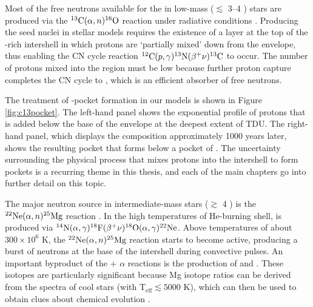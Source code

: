 Most of the free neutrons available for the \sprocess in low-mass ($\lesssim$ 3--4 \Msun) stars are produced via the $\mbox{${}^{13}{\text{C}}$}(\alpha,n)\mbox{${}^{16}{\text{O}}$}$ reaction under radiative conditions \citep{Cameron:1957eo,Scalo:1978ke,Straniero:1995ed,Gallino:1998eg}. Producing the seed  nuclei in stellar models requires the existence of a layer at the top of the -rich intershell in which protons are `partially mixed' down from the envelope, thus enabling the CN cycle reaction $\mbox{${}^{12}{\text{C}}$}(p,\gamma)\mbox{${}^{13}{\text{N}}$}(\beta^+\nu)\mbox{${}^{13}{\text{C}}$}$ to occur. The number of protons mixed into the region must be low because further proton capture completes the CN cycle to , which is an efficient absorber of free neutrons.

The treatment of -pocket formation in our models is shown in Figure \ref{fig:c13pocket}. The left-hand panel shows the exponential profile of protons that is added below the base of the envelope at the deepest extent of TDU. The right-hand panel, which displays the composition approximately 1000 years later, shows the resulting  pocket that forms below a pocket of . The uncertainty surrounding the physical process that mixes protons into the intershell to form  pockets is a recurring theme in this thesis, and each of the main chapters go into further detail on this topic.

The major neutron source in intermediate-mass stars ($\gtrsim$ 4 \Msun) is the $\mbox{${}^{22}{\text{Ne}}$}(\alpha,n)\allowbreak\mbox{${}^{25}{\text{Mg}}$}$ reaction \citep{Iben:1975bn,Scalo:1978ke}. In the high temperatures of He-burning shell,  is produced via $\mbox{${}^{14}{\text{N}}$}(\alpha,\gamma)\mbox{${}^{18}{\text{F}}$}(\beta^+\nu)\mbox{${}^{18}{\text{O}}$}(\alpha,\gamma)\mbox{${}^{22}{\text{Ne}}$}$. Above temperatures of about $300\times 10^6$ K, the $\mbox{${}^{22}{\text{Ne}}$}(\alpha,n)\mbox{${}^{25}{\text{Mg}}$}$ reaction starts to become active, producing a burst of neutrons at the base of the intershell during convective pulses. An important byproduct of the  + $\alpha$ reactions is the production of  and . These isotopes are particularly significant because Mg isotope ratios can be derived from the spectra of cool stars (with T$_\mathrm{eff}\lesssim 5000$ K), which can then be used to obtain clues about chemical evolution \citep[e.g.,][]{Yong:2003kb}.

